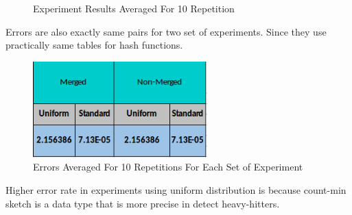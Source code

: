 \documentclass[twoside]{article}
\begin{document}
\begin{figure}[H]
	\centering
	\caption{Experiment Results Averaged For 10 Repetition}
\end{figure}


\par Errors are also exactly same pairs for two set of experiments. Since they use practically same tables for hash functions.

\begin{figure}[H]
	\centering
	\includegraphics[width=0.6\textwidth]{errors.png}
	\caption{Errors Averaged For 10 Repetitions For Each Set of Experiment}
\end{figure}

\par Higher error rate in experiments using uniform distribution is because count-min sketch is a data type that is more precise in detect heavy-hitters.
\end{document}
